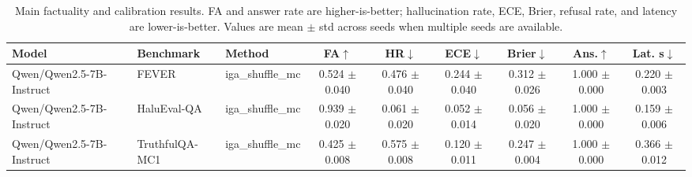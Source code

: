 \begin{table}[t]
\centering
\caption{Main factuality and calibration results. FA and answer rate are higher-is-better; hallucination rate, ECE, Brier, refusal rate, and latency are lower-is-better. Values are mean $\pm$ std across seeds when multiple seeds are available.}
\label{tab:main_results}
\small
\begin{tabular}{lllcccccc}
\toprule
Model & Benchmark & Method & FA$\uparrow$ & HR$\downarrow$ & ECE$\downarrow$ & Brier$\downarrow$ & Ans.$\uparrow$ & Lat. s$\downarrow$ \\
\midrule
Qwen/Qwen2.5-7B-Instruct & FEVER & iga\_shuffle\_mc & 0.524 $\pm$ 0.040 & 0.476 $\pm$ 0.040 & 0.244 $\pm$ 0.040 & 0.312 $\pm$ 0.026 & 1.000 $\pm$ 0.000 & 0.220 $\pm$ 0.003 \\
Qwen/Qwen2.5-7B-Instruct & HaluEval-QA & iga\_shuffle\_mc & 0.939 $\pm$ 0.020 & 0.061 $\pm$ 0.020 & 0.052 $\pm$ 0.014 & 0.056 $\pm$ 0.020 & 1.000 $\pm$ 0.000 & 0.159 $\pm$ 0.006 \\
Qwen/Qwen2.5-7B-Instruct & TruthfulQA-MC1 & iga\_shuffle\_mc & 0.425 $\pm$ 0.008 & 0.575 $\pm$ 0.008 & 0.120 $\pm$ 0.011 & 0.247 $\pm$ 0.004 & 1.000 $\pm$ 0.000 & 0.366 $\pm$ 0.012 \\
\bottomrule
\end{tabular}
\end{table}
